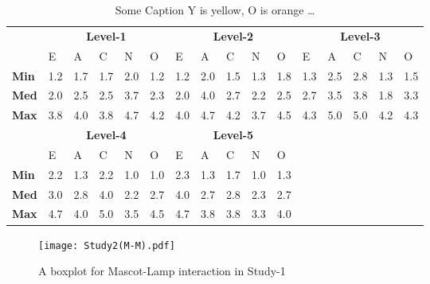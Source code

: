 \begin{table}[H]
    \renewcommand{\arraystretch}{1.2}
    \caption{Some Caption Y is yellow, O is orange \ldots}
    \label{table:medianMM2}
    \begin{center}
        \begin{tabular}{p{}|
        p{}|p{}|p{}|p{}|p{}||
        p{}|p{}|p{}|p{}|p{}||
        p{}|p{}|p{}|p{}|p{}|}
            \cline{2-16}
            & \multicolumn{5}{c||}{\textbf{Level-1}} & \multicolumn{5}{c||}{\textbf{Level-2}}
            & \multicolumn{5}{c|}{\textbf{Level-3}} \\
            \cline{2-16}
            & E & A & C & N & O  			    & E & A & C & N & O   	 	& E & A & C & N & O      \\
            \cline{2-16}
            \textbf{Min}  	& 1.2 & 1.7 & 1.7 & 2.0 & 1.2 		& 1.2 & 2.0 & 1.5 & 1.3 & 1.8  	& 1.3 & 2.5 & 2.8 & 1.3 & 1.5  \\
            \textbf{Med} 	& 2.0 & 2.5 & 2.5 & 3.7 & 2.3 		& 2.0 & 4.0 & 2.7 & 2.2 & 2.5  	& 2.7 & 3.5 & 3.8 & 1.8 & 3.3  \\
            \textbf{Max}	& 3.8 & 4.0 & 3.8 & 4.7 & 4.2 		& 4.0 & 4.7 & 4.2 & 3.7 & 4.5  	& 4.3 & 5.0 & 5.0 & 4.2 & 4.3 \\
            \cline{2-16}
            \cline{2-11}
            &  \multicolumn{5}{|c||}{\textbf{Level-4}} & \multicolumn{5}{|c||}{\textbf{Level-5}} \\
            \cline{2-11}
            & E & A & C & N & O  			& E & A & C & N & O     		\\
            \cline{2-11}
            \textbf{Min} 	& 2.2 & 1.3 & 2.2 & 1.0 & 1.0 		& 2.3 & 1.3 & 1.7 & 1.0 & 1.3 	\\
            \textbf{Med}    & 3.0 & 2.8 & 4.0 & 2.2 & 2.7 	    & 4.0 & 2.7 & 2.8 & 2.3 & 2.7 	\\
            \textbf{Max}  	& 4.7 & 4.0 & 5.0 & 3.5 & 4.5 		& 4.7 & 3.8 & 3.8 & 3.3 & 4.0  	\\
            \cline{2-11}
        \end{tabular}
    \end{center}
\end{table}

\begin{figure}[H]
    \centering
    \texttt{[image: Study2(M-M).pdf]}
    \caption{A boxplot for Mascot-Lamp interaction in Study-1}
    \label{fig:MM2}
\end{figure}

